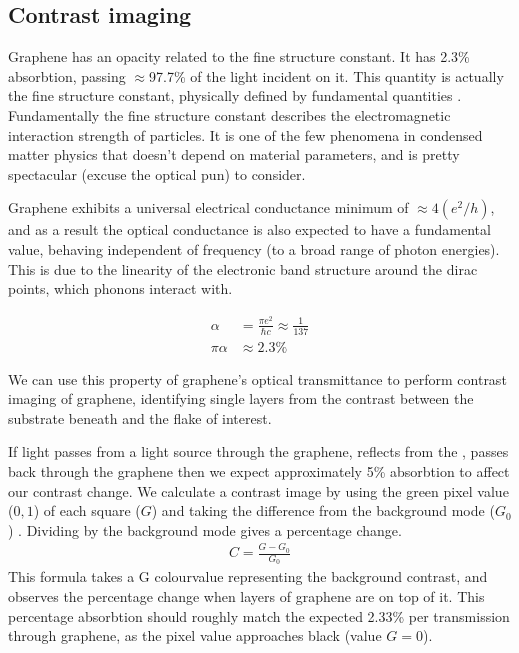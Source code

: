 \documentclass[../Matt_Gebert_Honours_Thesis.tex]{subfiles}
\begin{document}
\subsection{Contrast imaging}
Graphene has an opacity related to the fine structure constant. It has 2.3\% absorbtion, passing $\approx$97.7\% of the light incident on it. This quantity is actually the fine structure constant, physically defined by fundamental quantities \cite{nair_fine_2008}. Fundamentally the fine structure constant describes the electromagnetic interaction strength of particles. It is one of the few phenomena in condensed matter physics that doesn't depend on material parameters, and is pretty spectacular (excuse the optical pun) to consider. 

Graphene exhibits a universal electrical conductance minimum of $\approx 4 (e^2/h)$, and as a result \cite{kuzmenko_universal_2008} the optical conductance is also expected to have a fundamental value, behaving independent of frequency (to a broad range of photon energies). This is due to the linearity of the electronic band structure around the dirac points, which phonons interact with.

\begin{align}
	\alpha&= \frac{\pi e^2}{\hbar c} \approx \frac{1}{137}\\
	\pi \alpha &\approx 2.3\%
\end{align}

We can use this property of graphene's optical transmittance to perform contrast imaging of graphene, identifying single layers from the contrast between the substrate beneath and the flake of interest.  \cite{li_rapid_2013,wang_thickness_2012,ni_graphene_2007} 

If light passes from a light source through the graphene, reflects from the \silicondioxide{}, passes back through the graphene then we expect approximately 5\% absorbtion to affect our contrast change.
We calculate a contrast image by using the green pixel value ($0,1$) of each square ($G$) and taking the difference from the background mode ($G_0$) \cite{ni_graphene_2007,wang_thickness_2012}. Dividing by the background mode gives a percentage change.
\begin{align}
C = \frac{G-G_0}{G_0}\label{eqn:contrast}
\end{align}
This formula takes a G colourvalue representing the background contrast, and observes the percentage change when layers of graphene are on top of it. This percentage absorbtion should roughly match the expected 2.33\% per transmission through graphene, as the pixel value approaches black (value $G=0$).
\end{document}
